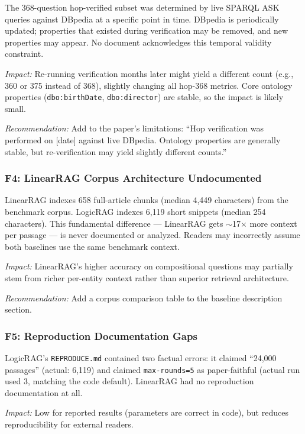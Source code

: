 The 368-question hop-verified subset was determined by live SPARQL ASK queries against DBpedia at a specific point in time. DBpedia is periodically updated; properties that existed during verification may be removed, and new properties may appear. No document acknowledges this temporal validity constraint.

\textit{Impact:} Re-running verification months later might yield a different count (e.g., 360 or 375 instead of 368), slightly changing all hop-368 metrics. Core ontology properties (\texttt{dbo:birthDate}, \texttt{dbo:director}) are stable, so the impact is likely small.

\textit{Recommendation:} Add to the paper's limitations: ``Hop verification was performed on [date] against live DBpedia. Ontology properties are generally stable, but re-verification may yield slightly different counts.''

\subsubsection{F4: LinearRAG Corpus Architecture Undocumented}

LinearRAG indexes 658 full-article chunks (median 4{,}449 characters) from the benchmark corpus. LogicRAG indexes 6{,}119 short snippets (median 254 characters). This fundamental difference --- LinearRAG gets $\sim$17$\times$ more context per passage --- is never documented or analyzed. Readers may incorrectly assume both baselines use the same benchmark context.

\textit{Impact:} LinearRAG's higher accuracy on compositional questions may partially stem from richer per-entity context rather than superior retrieval architecture.

\textit{Recommendation:} Add a corpus comparison table to the baseline description section.

\subsubsection{F5: Reproduction Documentation Gaps}

LogicRAG's \texttt{REPRODUCE.md} contained two factual errors: it claimed ``24{,}000 passages'' (actual: 6{,}119) and claimed \texttt{max-rounds=5} as paper-faithful (actual run used 3, matching the code default). LinearRAG had no reproduction documentation at all.

\textit{Impact:} Low for reported results (parameters are correct in code), but reduces reproducibility for external readers.

